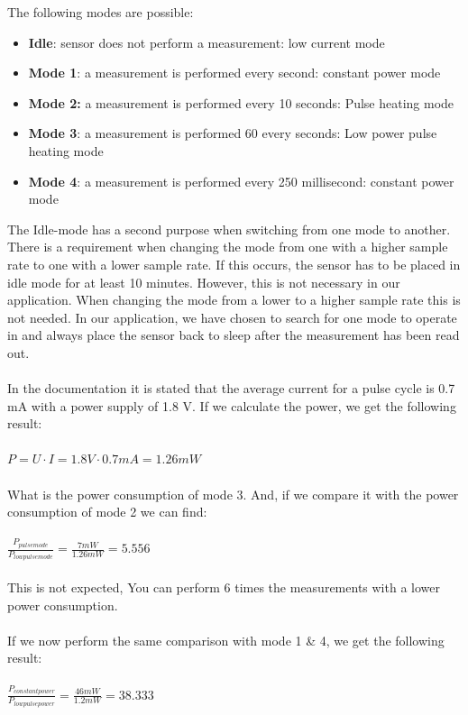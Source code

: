 \documentclass[11pt,a4paper]{article}
\begin{document}
The following modes are possible:
\begin{itemize}
	\item \textbf{Idle}: sensor does not perform a measurement: low current mode
	\item \textbf{Mode 1}: a measurement is performed every second: constant power mode
	\item \textbf{Mode 2:}  a measurement is performed every 10 seconds: Pulse heating mode
	\item \textbf{Mode 3}:  a measurement is performed 60 every seconds: Low power pulse heating mode
	\item \textbf{Mode 4}: a measurement is performed every 250 millisecond: constant power mode
\end{itemize}
The Idle-mode has a second purpose when switching from one mode to another. There is a requirement when changing the mode from one with a higher sample rate to one with a lower sample rate. If this occurs, the sensor has to be placed in idle mode for at least 10 minutes. However, this is not necessary in our application. When changing the mode from a lower to a higher sample rate this is not needed. In our application, we have chosen to search for one mode to operate in and always place the sensor back to sleep after the measurement has been read out.
\\ \\
In the documentation it is stated that the average current for a pulse cycle is 0.7 mA with a power supply of 1.8 V. If we calculate the power, we get the following result:
\\ \\
$P= U \cdot I=1.8 V \cdot 0.7 mA = 1.26 mW$
\\ \\
What is the power consumption of mode 3. And, if we compare it with the power consumption of mode 2 we can find:
\\ \\
$\frac{P_{pulse mode}}{P_{low pulse mode}}= \frac{7 mW}{1.26 mW}= 5.556$
\\ \\
This is not expected, You can perform 6 times the measurements with a lower power consumption.
\\ \\
If we now perform the same comparison with mode 1 \& 4, we get the following result:
\\ \\
$\frac{P_{constant power}} {P_{low pulse power}}= \frac{46mW}{1.2 mW}= 38.333$
\end{document}
